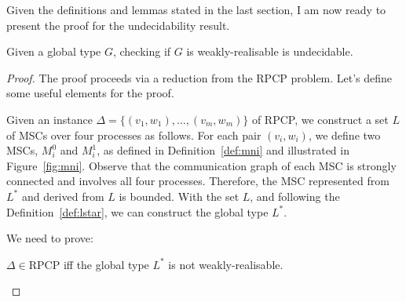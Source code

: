 Given the definitions and lemmas stated in the last section, I am now ready
to present the proof for the undecidability result.

\bigskip

\begin{theorem}\label{thm:main}
	Given a global type $G$, checking if $G$ is weakly-realisable is undecidable.
\end{theorem}

\begin{proof}
	The proof proceeds via a reduction from the RPCP problem. Let's define some useful
	elements for the proof.

	Given an instance $\Delta = \{(v_1, w_1), \ldots, (v_m, w_m)\}$ of RPCP, we
	construct a set $L$ of MSCs over four processes as follows. For each pair
	$(v_i, w_i)$, we define two MSCs, $M^0_i$ and $M^1_i$, as defined in 
	Definition~\ref{def:mni} and illustrated in	Figure~\ref{fig:mni}.
	Observe that the communication graph of each MSC is strongly connected and
	involves all four processes. Therefore, the MSC represented from
	$L^*$ and derived from $L$ is bounded.
	With the set $L$, and following the Definition~\ref{def:lstar},
	we can construct the global type $L^*$.

	We need to prove:
	\begin{center}
		$\Delta \in \text{RPCP}$ iff the global type $L^*$ is not weakly-realisable.
	\end{center}


\end{proof}
